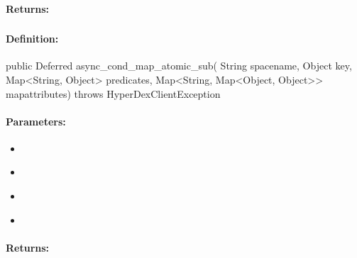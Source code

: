 \paragraph{Returns:}


\pagebreak
\subsubsection{}
\label{api:java:async_cond_map_atomic_sub}


\paragraph{Definition:}
\begin{javacode}
public Deferred async_cond_map_atomic_sub(
        String spacename,
        Object key,
        Map<String, Object> predicates,
        Map<String, Map<Object, Object>> mapattributes) throws HyperDexClientException
\end{javacode}

\paragraph{Parameters:}
\begin{itemize}[noitemsep]
\item {}\\

\item {}\\

\item {}\\

\item {}\\

\end{itemize}

\paragraph{Returns:}


